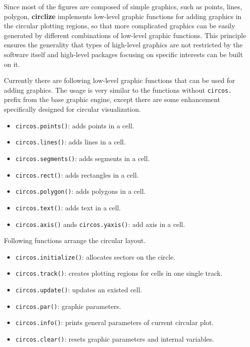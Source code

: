 \documentclass[]{book}
\providecommand{\tightlist}{%
  \setlength{\itemsep}{0pt}\setlength{\parskip}{0pt}}
\theoremstyle{definition}
\theoremstyle{definition}
\theoremstyle{remark}
\begin{document}
Since most of the figures are composed of simple graphics, such as
points, lines, polygon, \textbf{circlize} implements low-level graphic
functions for adding graphics in the circular plotting regions, so that
more complicated graphics can be easily generated by different
combinations of low-level graphic functions. This principle ensures the
generality that types of high-level graphics are not restricted by the
software itself and high-level packages focusing on specific interests
can be built on it.

Currently there are following low-level graphic functions that can be
used for adding graphics. The usage is very similar to the functions
without \texttt{circos.} prefix from the base graphic engine, except
there are some enhancement specifically designed for circular
visualization.

\begin{itemize}
\tightlist
\item
  \texttt{circos.points()}: adds points in a cell.
\item
  \texttt{circos.lines()}: adds lines in a cell.
\item
  \texttt{circos.segments()}: adds segments in a cell.
\item
  \texttt{circos.rect()}: adds rectangles in a cell.
\item
  \texttt{circos.polygon()}: adds polygons in a cell.
\item
  \texttt{circos.text()}: adds text in a cell.
\item
  \texttt{circos.axis()} ands \texttt{circos.yaxis()}: add axis in a
  cell.
\end{itemize}

Following functions arrange the circular layout.

\begin{itemize}
\tightlist
\item
  \texttt{circos.initialize()}: allocates sectors on the circle.
\item
  \texttt{circos.track()}: creates plotting regions for cells in one
  single track.
\item
  \texttt{circos.update()}: updates an existed cell.
\item
  \texttt{circos.par()}: graphic parameters.
\item
  \texttt{circos.info()}: prints general parameters of current circular
  plot.
\item
  \texttt{circos.clear()}: resets graphic parameters and internal
  variables.
\end{itemize}
\end{document}
